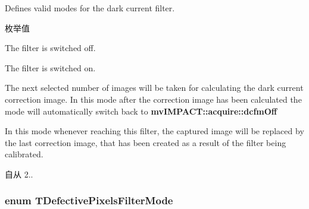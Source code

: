Defines valid modes for the dark current filter. 

\begin{Desc}
\item[枚举值]\par
\begin{description}
\item[{\em 
\hypertarget{group___common_interface_gga529300ca9481f6773a3a6f7d360191edaaf14d3c8753ba4948f50b92d693d4b0c}{dcfm\+Off}\label{group___common_interface_gga529300ca9481f6773a3a6f7d360191edaaf14d3c8753ba4948f50b92d693d4b0c}
}]The filter is switched off. \item[{\em 
\hypertarget{group___common_interface_gga529300ca9481f6773a3a6f7d360191edad335a244db80e67a1267c517cc4f0eb7}{dcfm\+On}\label{group___common_interface_gga529300ca9481f6773a3a6f7d360191edad335a244db80e67a1267c517cc4f0eb7}
}]The filter is switched on. \item[{\em 
\hypertarget{group___common_interface_gga529300ca9481f6773a3a6f7d360191eda4ab95fb68aaa414909538e41df6ae8cc}{dcfm\+Calibrate\+Dark\+Current}\label{group___common_interface_gga529300ca9481f6773a3a6f7d360191eda4ab95fb68aaa414909538e41df6ae8cc}
}]The next selected number of images will be taken for calculating the dark current correction image. In this mode after the correction image has been calculated the mode will automatically switch back to {\bfseries mv\+I\+M\+P\+A\+C\+T\+::acquire\+::dcfm\+Off} \item[{\em 
\hypertarget{group___common_interface_gga529300ca9481f6773a3a6f7d360191edabe4914e74d2d0f6ee4578f8d6322a164}{dcfm\+Transmit\+Correction\+Image}\label{group___common_interface_gga529300ca9481f6773a3a6f7d360191edabe4914e74d2d0f6ee4578f8d6322a164}
}]In this mode whenever reaching this filter, the captured image will be replaced by the last correction image, that has been created as a result of the filter being calibrated. \begin{DoxySince}{自从}
2.. 
\end{DoxySince}
\end{description}
\end{Desc}
\hypertarget{group___common_interface_ga026aca333783574cb87c7cd7bebfc2fd}{
\subsubsection[{T\+Defective\+Pixels\+Filter\+Mode}]{\setlength{\rightskip}{0pt plus 5cm}enum {\bf T\+Defective\+Pixels\+Filter\+Mode}}}\label{group___common_interface_ga026aca333783574cb87c7cd7bebfc2fd}


